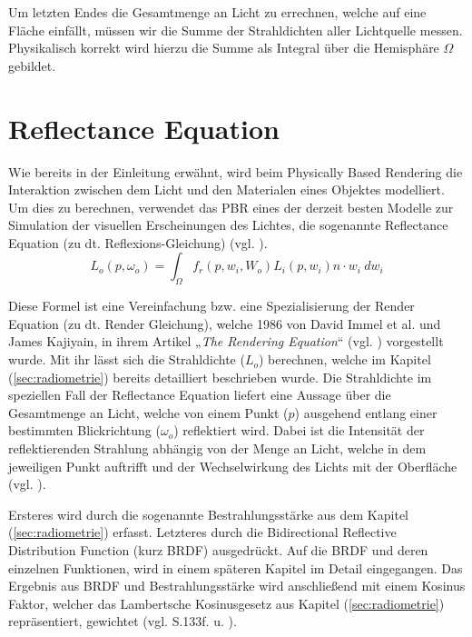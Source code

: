 \documentclass[
  11pt,
  a4paper,
  oneside
  ]{article}
\begin{document}
Um letzten Endes die Gesamtmenge an Licht zu errechnen, welche auf eine Fläche einfällt, müssen wir die Summe der Strahldichten aller Lichtquelle messen. Physikalisch korrekt wird hierzu die Summe als Integral über die Hemisphäre $\Omega$ gebildet. 
\section{Reflectance Equation}
Wie bereits in der Einleitung erwähnt, wird beim Physically Based Rendering die Interaktion zwischen dem Licht und den Materialen eines Objektes modelliert. Um dies zu berechnen, verwendet das PBR eines der derzeit besten Modelle zur Simulation der visuellen Erscheinungen des Lichtes, die sogenannte Reflectance Equation (zu dt. Reflexions-Gleichung) 
(vgl. \cite{learnOpenGL}). 
\[L_{o}\left( p,\omega _{o}\right) =\int _{\Omega }f_{r}\left( p,w_{i},W_{o}\right)L_{i}\left( p,w_{i}\right)n\cdot w_{i} \ dw_{i}\] %

Diese Formel ist eine Vereinfachung bzw. eine Spezialisierung der Render Equation (zu dt. Render Gleichung), welche 1986 von David Immel et al. und James Kajiyain, in ihrem Artikel „\textit{The Rendering Equation}“ (vgl. \cite{theRenderingEquation}) vorgestellt wurde. Mit ihr lässt sich die Strahldichte ($L_{o}$) berechnen, welche im Kapitel (\ref{sec:radiometrie}) bereits detailliert beschrieben wurde. Die Strahldichte im speziellen Fall der Reflectance Equation liefert eine Aussage über die Gesamtmenge an Licht, welche von einem Punkt ($p$) ausgehend entlang einer bestimmten Blickrichtung ($\omega_{o}$) reflektiert wird. Dabei ist die Intensität der reflektierenden Strahlung abhängig von der Menge an Licht, welche in dem jeweiligen Punkt auftrifft und der Wechselwirkung des Lichts mit der Oberfläche (vgl. \cite{learnOpenGL}). 

Ersteres wird durch die sogenannte Bestrahlungsstärke aus dem Kapitel (\ref{sec:radiometrie}) erfasst. Letzteres durch die Bidirectional Reflective Distribution Function (kurz BRDF) ausgedrückt. Auf die BRDF und deren einzelnen Funktionen, wird in einem späteren Kapitel im Detail eingegangen. Das Ergebnis aus BRDF und Bestrahlungsstärke wird anschließend mit einem Kosinus Faktor, welcher das Lambertsche Kosinusgesetz aus Kapitel (\ref{sec:radiometrie}) repräsentiert, gewichtet 
(vgl. S.133f. \cite{openGlWolf} u. \cite{learnOpenGL}).
\end{document}
